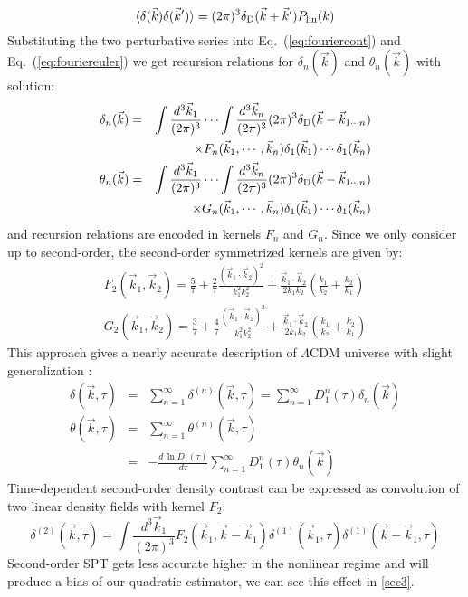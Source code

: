 \documentclass[prd,amsmath,amssymb,floatfix,superscriptaddress,nofootinbib,twocolumn]{revtex4-1}
\def\be{\begin{equation}}
\def\ee{\end{equation}}
\def\bea{\begin{eqnarray}}
\def\eea{\end{eqnarray}}
\newcommand{\vs}{\nonumber\\}
\newcommand{\vk}{\vec{k}}
\newcommand{\ec}[1]{Eq.~(\ref{eq:#1})}
\newcommand{\eql}[1]{\label{eq:#1}}
\begin{document}
\be 
\langle {\delta}(\vk){\delta}(\vk') \rangle =(2\pi)^3 \delta_{\rm D}(\vk+\vk')P_{\rm lin}(k) \eql{lin}
\ee 
Substituting the two perturbative series into \ec{fouriercont} and \ec{fouriereuler} we get recursion relations for ${\delta}_{n}(\vk)$ and ${\theta}_{n}(\vk)$ with solution:
\bea
{\delta}_{n}(\vk) &=& \int \frac{d^{3}\vk_{1}}{(2\pi)^3} \cdots \int \frac{d^{3}\vk_{n}}{(2\pi)^3}(2\pi)^3 \delta_{\rm D} (\vk-\vk_{1\cdots n}) \vs
&&\times F_{n}(\vk_1,\cdots,\vk_n){\delta}_1(\vk_{1}) \cdots {\delta}_1(\vk_{n}) \\
{\theta}_{n}(\vk) &=& \int \frac{d^{3}\vk_{1}}{(2\pi)^3} \cdots \int \frac{d^{3}\vk_{n}}{(2\pi)^3}(2\pi)^3 \delta_{\rm D} (\vk-\vk_{1\cdots n}) \vs
&&\times G_{n}(\vk_1,\cdots,\vk_n){\delta}_1(\vk_{1}) \cdots {\delta}_1(\vk_{n})
\eea
and recursion relations are encoded in kernels $F_n$ and $G_n$. Since we only consider up to second-order, the second-order symmetrized kernels are given by:
\bea 
F_{2}(\vk_1,\vk_2)=\frac{5}{7}+\frac{2}{7}\frac{(\vk_1\cdot \vk_2)^2}{k_1^2 k_2^2}+\frac{\vk_1\cdot \vk_2}{2k_1k_2}(\frac{k_1}{k_2}+\frac{k_2}{k_1}) \\
G_{2}(\vk_1,\vk_2)=\frac{3}{7}+\frac{4}{7}\frac{(\vk_1\cdot \vk_2)^2}{k_1^2 k_2^2}+\frac{\vk_1\cdot \vk_2}{2k_1k_2}(\frac{k_1}{k_2}+\frac{k_2}{k_1})
\eea 
This approach gives a nearly accurate description of $\Lambda$CDM universe \cite{Takahashi:2008to} with slight generalization \cite{Bernardeau:2002rev}:
\bea
{\delta}(\vk,\tau) &=&\sum_{n=1}^{\infty} {\delta}^{(n)}(\vk,\tau)=\sum_{n=1}^{\infty}D_1^{n}(\tau)\delta_{n}(\vk) \\
{\theta}(\vk,\tau)&=&\sum_{n=1}^{\infty}{\theta}^{(n)}(\vk,\tau)\vs
&=&-\frac{d\,\ln D_1(\tau)}{d\tau}\sum_{n=1}^{\infty}D_1^{n}(\tau)\theta_{n}(\vk) 
\eea
Time-dependent second-order density contrast can be expressed as convolution of two linear density fields with kernel $F_2$:
\be 
{\delta}^{(2)}(\vk,\tau)=\int \frac{d^{3}\vk_{1}}{(2\pi)^3} F_2(\vk_1,\vk-\vk_1){\delta}^{(1)}(\vk_1,\tau) {\delta}^{(1)}(\vk-\vk_1,\tau) \eql{sorder}
\ee 
Second-order SPT gets less accurate higher in the nonlinear regime and will produce a bias of our quadratic estimator, we can see this effect in \ref{sec3}.
\end{document}
